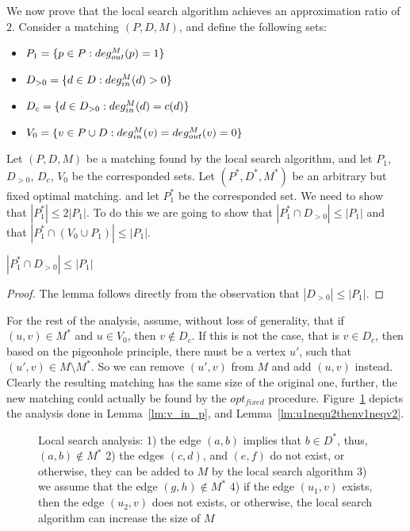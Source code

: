 We now prove that the local search algorithm achieves an approximation ratio of $2$.
Consider a matching $(P, D, M)$, and define the following sets:
\begin{itemize}
\item $P_1 = \{p \in P : deg^M_{out}(p) = 1\}$
\item $D_{>0} = \{d \in D : deg^M_{in}(d) > 0\}$
\item $D_c = \{d \in D_{>0} : deg^M_{in}(d) = c(d)\}$
\item $V_0 = \{v \in P \cup D : deg^M_{in}(v) = deg^M_{out}(v) = 0\}$ 
\end{itemize}

Let $(P, D, M)$ be a matching found by the local search algorithm, 
and let $P_1$, $D_{>0}$, $D_c$, $V_0$ be the corresponded sets.
Let $(P^*, D^*, M^*)$ be an arbitrary but fixed optimal matching.
and let $P^*_1$ be the corresponded set.
We need to show that $|P^*_1| \leq 2|P_1|$.
To do this we are going to show that 
$|P^*_1 \cap D_{>0}| \leq |P_1|$ 
and that
$|P^*_1 \cap (V_0 \cup P_1)| \leq |P_1|$.

\begin{lemma}
\label{lm:dleqp}
$|P^*_1 \cap D_{>0}| \leq |P_1|$
\end{lemma}

\begin{proof}
The lemma follows directly from the observation that 
${|D_{>0}| \leq |P_1|}$.
\end{proof}

For the rest of the analysis, assume, without loss of generality, that
if $(u, v) \in M^*$ and $u \in V_0$, then $v \notin D_c$.
If this is not the case, that is $v \in D_c$, then based on the pigeonhole principle,
there must be a vertex $u'$, such that $(u', v) \in M \setminus M^*$.
So we can remove $(u', v)$ from $M$ and add $(u, v)$ instead.
Clearly the resulting matching has the same size of the original one,
further, the new matching could actually be found by the $opt_{fixed}$ procedure.
Figure~\ref{fig:uwcm-illustration} depicts the analysis done in Lemma~\ref{lm:v_in_p},
and Lemma~\ref{lm:u1nequ2thenv1neqv2}.

\begin{figure}[ht]
\centering

\caption{
\label{fig:uwcm-illustration}
Local search analysis:
1) the edge $(a,b)$ implies that $b \in D^*$, thus, $(a,b) \notin M^*$
2) the edges $(c,d)$, and $(e,f)$ do not exist, or otherwise, 
they can be added to $M$ by the local search algorithm
3) we assume that the edge $(g,h) \notin M^*$
4) if the edge $(u_1, v)$ exists, then the edge $(u_2, v)$ does not exists, 
or otherwise, the local search algorithm can increase the size of $M$
}
\end{figure}

